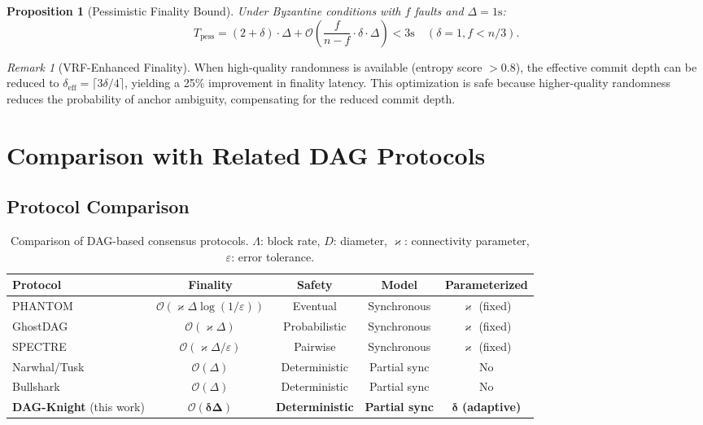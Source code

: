 \documentclass[11pt,a4paper]{article}
\newtheorem{proposition}[theorem]{Proposition}
\theoremstyle{definition}
\theoremstyle{remark}
\newtheorem{remark}[theorem]{Remark}
\newcommand{\DK}{\textsf{DAG-Knight}}
\renewcommand{\kappa}{\varkappa}
\newcommand{\bigO}{\mathcal{O}}
\begin{document}
\begin{proposition}[Pessimistic Finality Bound]\label{prop:pessimistic-finality}
Under Byzantine conditions with $f$ faults and $\Delta = 1\text{s}$:
\[
  T_{\text{pess}} = (2 + \delta) \cdot \Delta +
  \bigO\!\left(\frac{f}{n-f} \cdot \delta \cdot \Delta\right) < 3\text{s}
  \quad (\delta = 1, f < n/3).
\]
\end{proposition}

\begin{remark}[VRF-Enhanced Finality]\label{rem:vrf-finality}
When high-quality randomness is available (entropy score $> 0.8$),
the effective commit depth can be reduced to $\delta_{\text{eff}} = \lceil 3\delta/4 \rceil$,
yielding a 25\% improvement in finality latency.
This optimization is safe because higher-quality randomness reduces the
probability of anchor ambiguity, compensating for the reduced commit depth.
\end{remark}

\section{Comparison with Related DAG Protocols}\label{sec:comparison}

\subsection{Protocol Comparison}

\begin{table}[t]
\centering
\caption{Comparison of DAG-based consensus protocols.
$\Lambda$: block rate, $D$: diameter, $\kappa$: connectivity parameter,
$\varepsilon$: error tolerance.}
\label{tab:comparison}
\begin{tabular}{@{}lcccc@{}}
\toprule
\textbf{Protocol} & \textbf{Finality} & \textbf{Safety} & \textbf{Model}
  & \textbf{Parameterized} \\
\midrule
PHANTOM~\cite{sompolinsky2021phantom}
  & $\bigO(\kappa \Delta \log(1/\varepsilon))$
  & Eventual & Synchronous & $\kappa$ (fixed) \\
GhostDAG~\cite{sompolinsky2021phantom}
  & $\bigO(\kappa \Delta)$
  & Probabilistic & Synchronous & $\kappa$ (fixed) \\
SPECTRE~\cite{sompolinsky2018spectre}
  & $\bigO(\kappa \Delta / \varepsilon)$
  & Pairwise & Synchronous & $\kappa$ (fixed) \\
Narwhal/Tusk~\cite{danezis2022narwhal}
  & $\bigO(\Delta)$
  & Deterministic & Partial sync & No \\
Bullshark~\cite{spiegelman2022bullshark}
  & $\bigO(\Delta)$
  & Deterministic & Partial sync & No \\
\midrule
\textbf{\DK{}} (this work)
  & $\boldsymbol{\bigO(\delta \Delta)}$
  & \textbf{Deterministic} & \textbf{Partial sync} & $\boldsymbol{\delta}$ \textbf{(adaptive)} \\
\bottomrule
\end{tabular}
\end{table}
\end{document}
